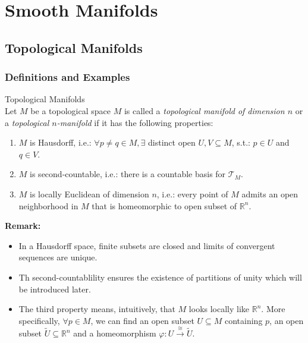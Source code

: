 \chapter{Smooth Manifolds}

\section{Topological Manifolds}

\subsection{Definitions and Examples}

\begin{definition}{Topological Manifolds}\\
Let $M$ be a topological space $M$ is called a \textit{topological manifold of dimension $n$} or a \textit{topological $n$-manifold} if it has the following properties:
\begin{enumerate}
    \item $M$ is Hausdorff, i.e.: $\forall p\neq q\in M, \exists$ distinct open $U,V\subseteq M$, s.t.: $p\in U$ and $q\in V$.
    \item $M$ is second-countable, i.e.: there is a countable basis for $\mathcal{T}_M$.
    \item $M$ is locally Euclidean of dimension $n$, i.e.: every point of $M$ admits an open neighborhood in $M$ that is homeomorphic to open subset of $\mathbb{R}^n$.
\end{enumerate}
\end{definition}

\noindent \textbf{Remark:} \begin{itemize}
    \item In a Hausdorff space, finite subsets are closed and limits of convergent sequences are unique.

    \item Th second-countablility ensures the existence of partitions of unity which will be introduced later.

    \item The third property means, intuitively, that $M$ looks locally like $\mathbb{R}^n$. More specifically, $\forall p\in M$, we can find an open subset $U\subseteq M$ containing $p$, an open subset $\tilde{U} \subseteq \mathbb{R}^n$ and a homeomorphism $\varphi:U \xrightarrow{\cong} \tilde{U}$.
\end{itemize}

